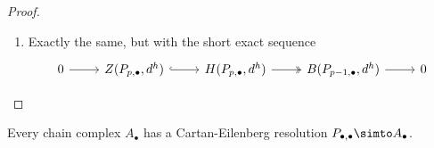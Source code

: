\documentclass[main.tex]{subfiles}
\begin{document}
\begin{proof}
\begin{enumerate}
    \item Exactly the same, but with the short exact sequence
      \begin{equation*}
        \begin{tikzcd}
          0
          \arrow[r]
          & Z(P_{p, \bullet}, d^{h})
          \arrow[r, hook]
          & H(P_{p, \bullet}, d^{h})
          \arrow[r, two heads]
          & B(P_{p-1, \bullet}, d^{h})
          \arrow[r]
          & 0
        \end{tikzcd}
      \end{equation*}
  \end{enumerate}
\end{proof}

\begin{proposition}
  Every chain complex $A_{\bullet}$ has a Cartan-Eilenberg resolution $P_{\bullet,\bullet} \simto A_{\bullet}$.
\end{proposition}
\end{document}
